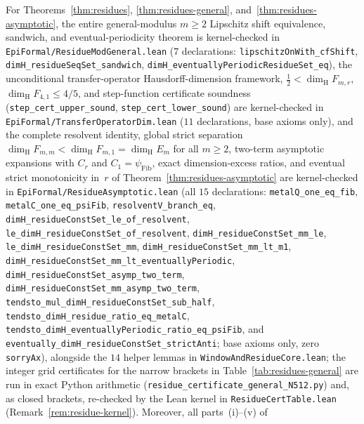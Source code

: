 \documentclass[11pt]{article}
\theoremstyle{definition}
\theoremstyle{remark}
\newcommand{\dimH}{\dim_{\mathrm{H}}}
\begin{document}
For Theorems~\ref{thm:residues}, \ref{thm:residues-general}, and~\ref{thm:residues-asymptotic}, the entire general-modulus $m\ge2$ Lipschitz shift equivalence, sandwich, and eventual-periodicity theorem is kernel-checked in \texttt{EpiFormal/\allowbreak Residue\allowbreak ModGeneral.lean} ($7$ declarations: \texttt{lipschitz\allowbreak OnWith\_\allowbreak cfShift}, \texttt{dimH\_\allowbreak residueSeqSet\_\allowbreak sandwich}, \texttt{dimH\_\allowbreak eventually\allowbreak PeriodicResidueSet\_\allowbreak eq}), the unconditional transfer-operator Hausdorff-dimension framework, $\frac12<\dimH F_{m,r}$, $\dimH F_{4,1}\le 4/5$, and step-function certificate soundness (\texttt{step\_\allowbreak cert\_\allowbreak upper\_\allowbreak sound}, \texttt{step\_\allowbreak cert\_\allowbreak lower\_\allowbreak sound}) are kernel-checked in \texttt{EpiFormal/\allowbreak Transfer\allowbreak Operator\allowbreak Dim.lean} ($11$ declarations, base axioms only), and the complete resolvent identity, global strict separation $\dimH F_{m,m}<\dimH F_{m,1}=\dimH E_m$ for all $m\ge2$, two-term asymptotic expansions with $C_r$ and $C_1=\psi_{\mathrm{Fib}}$, exact dimension-excess ratios, and eventual strict monotonicity in~$r$ of Theorem~\ref{thm:residues-asymptotic} are kernel-checked in \texttt{EpiFormal/\allowbreak Residue\allowbreak Asymptotic.lean} (all $15$ declarations: \texttt{metalQ\_\allowbreak one\_\allowbreak eq\_\allowbreak fib}, \texttt{metalC\_\allowbreak one\_\allowbreak eq\_\allowbreak psiFib}, \texttt{resolventV\_\allowbreak branch\_\allowbreak eq}, \texttt{dimH\_\allowbreak residueConstSet\_\allowbreak le\_\allowbreak of\_\allowbreak resolvent}, \texttt{le\_\allowbreak dimH\_\allowbreak residueConstSet\_\allowbreak of\_\allowbreak resolvent}, \texttt{dimH\_\allowbreak residueConstSet\_\allowbreak mm\_\allowbreak le}, \texttt{le\_\allowbreak dimH\_\allowbreak residueConstSet\_\allowbreak mm}, \texttt{dimH\_\allowbreak residueConstSet\_\allowbreak mm\_\allowbreak lt\_\allowbreak m1}, \texttt{dimH\_\allowbreak residueConstSet\_\allowbreak mm\_\allowbreak lt\_\allowbreak eventuallyPeriodic}, \texttt{dimH\_\allowbreak residueConstSet\_\allowbreak asymp\_\allowbreak two\_\allowbreak term}, \texttt{dimH\_\allowbreak residueConstSet\_\allowbreak mm\_\allowbreak asymp\_\allowbreak two\_\allowbreak term}, \texttt{tendsto\_\allowbreak mul\_\allowbreak dimH\_\allowbreak residueConstSet\_\allowbreak sub\_\allowbreak half}, \texttt{tendsto\_\allowbreak dimH\_\allowbreak residue\_\allowbreak ratio\_\allowbreak eq\_\allowbreak metalC}, \texttt{tendsto\_\allowbreak dimH\_\allowbreak eventuallyPeriodic\_\allowbreak ratio\_\allowbreak eq\_\allowbreak psiFib}, and \texttt{eventually\_\allowbreak dimH\_\allowbreak residueConstSet\_\allowbreak strictAnti}; base axioms only, zero \texttt{sorryAx}), alongside the $14$ helper lemmas in \texttt{Window\allowbreak And\allowbreak Residue\allowbreak Core.lean}; the integer grid certificates for the narrow brackets in Table~\ref{tab:residues-general} are run in exact Python arithmetic (\texttt{residue\_\allowbreak certificate\_\allowbreak general\_\allowbreak N512.py}) and, as closed brackets, re-checked by the Lean kernel in \texttt{Residue\allowbreak Cert\allowbreak Table.lean} (Remark~\ref{rem:residue-kernel}). Moreover, all parts~(i)--(v) of 
\end{document}
